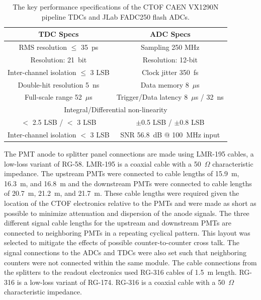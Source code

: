 \documentclass{elsart}
\begin{document}
\begin{table}[htbp]
\begin{center}
\begin{tabular}{c|c} \hline
TDC Specs                           & ADC Specs \\ \hline
RMS resolution $\le$ 35~ps          & Sampling 250 MHz \\ \hline 
Resolution: 21~bit                  & Resolution: 12-bit \\ \hline
Inter-channel isolation $\le$ 3 LSB & Clock jitter 350~fs \\ \hline
Double-hit resolution 5~ns          & Data memory 8~$\mu$s \\ \hline    
Full-scale range 52~$\mu$s          & Trigger/Data latency 8~$\mu$s / 32~ns \\ \hline  
\multicolumn{2}{c}{Integral/Differential non-linearity} \\
$<$ 2.5 LSB / $<$ 3 LSB             & $\pm$0.5 LSB / $\pm$0.8 LSB \\ \hline
Inter-channel isolation $<$ 3 LSB   & SNR 56.8~dB @ 100~MHz input \\ \hline
\end{tabular}
\end{center}
\caption{The key performance specifications of the CTOF CAEN VX1290N pipeline TDCs and JLab 
FADC250 flash ADCs.}
\label{tdcadc-specs}
\end{table}

The PMT anode to splitter panel connections are made using LMR-195 cables, a low-loss variant 
of RG-58. LMR-195 is a coaxial cable with a 50~$\Omega$ characteristic impedance. The
upstream PMTs were connected to cable lengths of 15.9~m, 16.3~m, and 16.8~m and the 
downstream PMTs were connected to cable lengths of 20.7~m, 21.2~m, and 21.7~m. These cable 
lengths were required given the location of the CTOF electronics relative 
to the PMTs and were made as short as possible to minimize attenuation and dispersion of the 
anode signals. The three different signal cable lengths for the upstream and downstream PMTs 
are connected to neighboring PMTs in a repeating cyclical pattern. This layout was selected 
to mitigate the effects of possible counter-to-counter cross talk. The signal connections to the ADCs 
and TDCs were also set such that neighboring counters were not connected within the same module.
The cable connections from the splitters to the readout electronics used RG-316 cables of
1.5~m length. RG-316 is a low-loss variant of RG-174. RG-316 is a coaxial cable with a 
50~$\Omega$ characteristic impedance.
\end{document}
